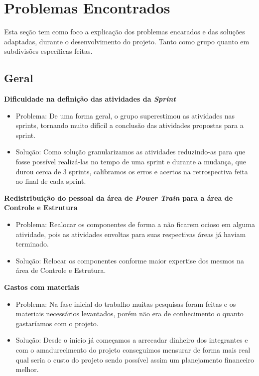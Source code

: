 \chapter[Problemas Encontrados]{Problemas Encontrados}

Esta seção tem como foco a explicação dos problemas encarados e das soluções adaptadas, durante o desenvolvimento do projeto. Tanto como grupo quanto em subdivisões específicas feitas.

 \section{Geral}

\textbf{Dificuldade na definição das atividades da \textit{Sprint}}
    \begin{itemize}
    \item Problema: De uma forma geral, o grupo superestimou as atividades nas sprints, tornando muito difícil a conclusão das atividades propostas para a sprint.
	  \item Solução: Como solução granularizamos as atividades reduzindo-as para que fosse possível realizá-las no tempo de uma sprint e durante a mudança, que durou cerca de 3 sprints, calibramos os erros e acertos na retrospectiva feita ao final de cada sprint.

    \end{itemize}

\textbf{Redistribuição do pessoal da área de \textit{Power Train} para a área de Controle e Estrutura}
    \begin{itemize}
    \item Problema: Realocar os componentes de forma a não ficarem ocioso em alguma atividade, pois as atividades envoltas para suas respectivas áreas já haviam terminado.
	  \item Solução: Relocar os componentes conforme maior expertise dos mesmos na área de Controle e Estrutura.
    \end{itemize}

\textbf{Gastos com materiais}
    \begin{itemize}
  \item Problema: Na fase inicial do trabalho muitas pesquisas foram feitas e os materiais necessários levantados, porém não era de conhecimento o quanto gastaríamos com o projeto.
  \item Solução: Desde o inicio já começamos a arrecadar dinheiro dos integrantes e com o amadurecimento do projeto conseguimos mensurar de forma mais real qual seria o custo do projeto sendo possível assim um planejamento financeiro melhor.

    \end{itemize}

